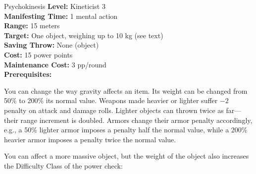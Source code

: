 {Psychokinesis}
{
	\textbf{Level:}
	Kineticist 3\\
	\textbf{Manifesting Time:}
	1 mental action\\
	\textbf{Range:}
	15 meters\\
	\textbf{Target:}
	One object, weighing up to 10 kg (see text)\\
	\textbf{Saving Throw:}
	None (object)\\
	\textbf{Cost:}
	15 power points\\
	\textbf{Maintenance Cost:}
	3 pp/round\\
	\textbf{Prerequisites:}
	\\
}
{
	You can change the way gravity affects an item. Its weight can be changed from 50\% to 200\% its normal value. Weapons made heavier or lighter suffer $-2$ penalty on attack and damage rolls. Lighter objects can thrown twice as far---their range increment is doubled. Armors change their armor penalty accordingly, e.g., a 50\% lighter armor imposes a penalty half the normal value, while a 200\% heavier armor imposes a penalty twice the normal value.

	You can affect a more massive object, but the weight of the object also increases the Difficulty Class of the power check:

}